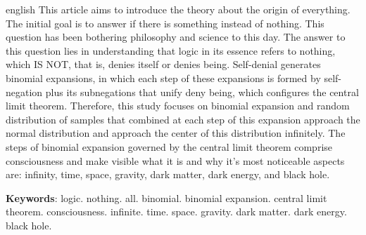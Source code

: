 \renewcommand{\resumoname}{Abstract}
\begin{resumoumacoluna}
 \begin{otherlanguage*}{english}
	This article aims to introduce the theory about the origin of everything. The initial goal is to answer if there is something instead of nothing. This question has been bothering philosophy and science to this day. The answer to this question lies in understanding that logic in its essence refers to nothing, which IS NOT, that is, denies itself or denies being. Self-denial generates binomial expansions, in which each step of these expansions is formed by self-negation plus its subnegations that unify deny being, which configures the central limit theorem. Therefore, this study focuses on binomial expansion and random distribution of samples that combined at each step of this expansion approach the normal distribution and approach the center of this distribution infinitely. The steps of binomial expansion governed by the central limit theorem comprise consciousness and make visible what it is and why it’s most noticeable aspects are: infinity, time, space, gravity, dark matter, dark energy, and black hole. 

	\vspace{\onelineskip}
 
	\noindent
	\textbf{Keywords}: 
logic. nothing. all. binomial. binomial expansion. central limit theorem. consciousness. infinite. time. space. gravity. dark matter. dark energy. black hole.
 \end{otherlanguage*}  
\end{resumoumacoluna}

